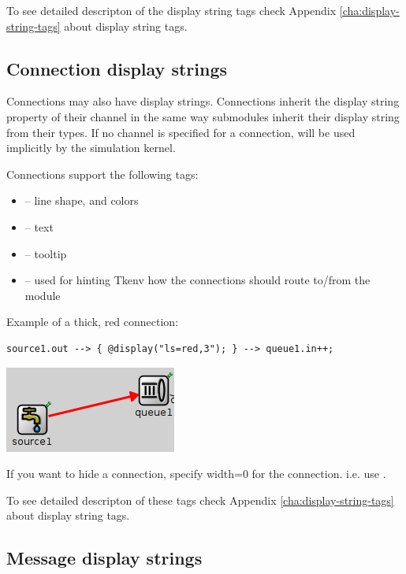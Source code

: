 To see detailed descripton of the display string tags check
Appendix \ref{cha:display-string-tags} about display string tags.

\subsection{Connection display strings}

Connections may also have display strings. Connections inherit the
display string property of their channel in the same way submodules inherit
their display string from their types. If no channel is specified for a
connection,  will be used implicitly by the simulation kernel.

Connections support the following tags:
\begin{itemize}
  \item{ -- line shape, and colors}
  \item{ -- text}
  \item{ -- tooltip}
  \item{ -- used for hinting Tkenv how the connections should route to/from the module}
\end{itemize}

Example of a thick, red connection:
\begin{verbatim}
source1.out --> { @display("ls=red,3"); } --> queue1.in++;
\end{verbatim}

\begin{center}
\includegraphics{figures/graphics-lstag}
\end{center}

\begin{note}
If you want to hide a connection, specify width=0 for the connection. i.e. use .
\end{note}

To see detailed descripton of these tags check
Appendix \ref{cha:display-string-tags} about display string tags.

\subsection{Message display strings}

